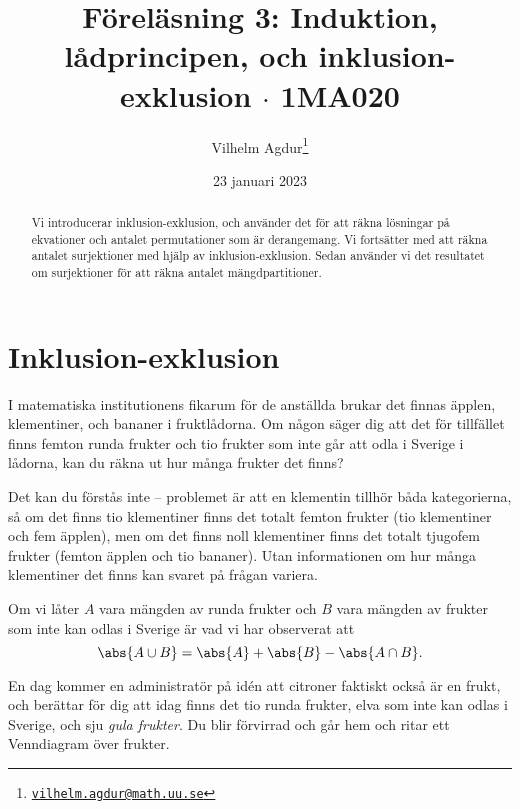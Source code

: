 \documentclass[nobib]{tufte-handout}
\title{Föreläsning 3: Induktion, lådprincipen, och inklusion-exklusion $\cdot$ 1MA020}
\author[Vilhelm Agdur]{Vilhelm Agdur\thanks{\href{mailto:vilhelm.agdur@math.uu.se}{\nolinkurl{vilhelm.agdur@math.uu.se}}}}
\date{23 januari 2023}
\begin{document}
\maketitle%

\begin{abstract}
\noindent
Vi introducerar inklusion-exklusion, och använder det för att räkna lösningar på ekvationer och antalet permutationer som är derangemang. Vi fortsätter med att räkna antalet surjektioner med hjälp av inklusion-exklusion. Sedan använder vi det resultatet om surjektioner för att räkna antalet mängdpartitioner.
\end{abstract}

\section{Inklusion-exklusion}

I matematiska institutionens fikarum för de anställda brukar det finnas äpplen, klementiner, och bananer i fruktlådorna. Om någon säger dig att det för tillfället finns femton runda frukter och tio frukter som inte går att odla i Sverige i lådorna, kan du räkna ut hur många frukter det finns?

Det kan du förstås inte -- problemet är att en klementin tillhör båda kategorierna, så om det finns tio klementiner finns det totalt femton frukter (tio klementiner och fem äpplen), men om det finns noll klementiner finns det totalt tjugofem frukter (femton äpplen och tio bananer). Utan informationen om hur många klementiner det finns kan svaret på frågan variera.

Om vi låter $A$ vara mängden av runda frukter och $B$ vara mängden av frukter som inte kan odlas i Sverige är vad vi har observerat att
$$\abs{A \cup B} = \abs{A} + \abs{B} - \abs{A \cap B}.$$

En dag kommer en administratör på idén att citroner faktiskt också är en frukt, och berättar för dig att idag finns det tio runda frukter, elva som inte kan odlas i Sverige, och sju \emph{gula frukter}. Du blir förvirrad och går hem och ritar ett Venndiagram över frukter.
\end{document}
